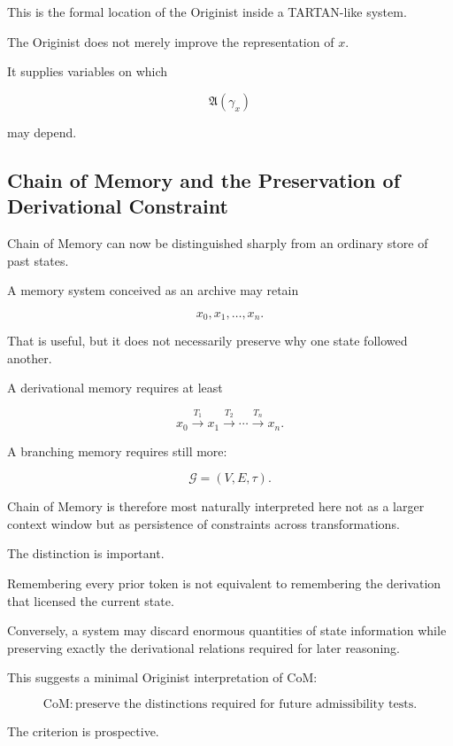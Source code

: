 \documentclass[
  11pt,
  a4paper,
  DIV=12,
  BCOR=0mm,
  parskip=half-
]{scrartcl}
\newcommand{\graphG}{\mathcal G}
\theoremstyle{definition}
\theoremstyle{plain}
\theoremstyle{remark}
\begin{document}
This is the formal location of the Originist inside a TARTAN-like system.

The Originist does not merely improve the representation of \(x\).

It supplies variables on which

\[
  \mathfrak A(\gamma_x)
\]

may depend.


\subsection{Chain of Memory and the Preservation of Derivational Constraint}
\label{sec:com}

Chain of Memory can now be distinguished sharply from an ordinary store of
past states.

A memory system conceived as an archive may retain

\[
  x_0,x_1,\ldots,x_n.
\]

That is useful, but it does not necessarily preserve why one state followed
another.

A derivational memory requires at least

\[
  x_0
  \xrightarrow{T_1}
  x_1
  \xrightarrow{T_2}
  \cdots
  \xrightarrow{T_n}
  x_n.
\]

A branching memory requires still more:

\[
  \graphG=(V,E,\tau).
\]

Chain of Memory is therefore most naturally interpreted here not as a larger
context window but as persistence of constraints across transformations.

The distinction is important.

Remembering every prior token is not equivalent to remembering the derivation
that licensed the current state.

Conversely, a system may discard enormous quantities of state information
while preserving exactly the derivational relations required for later
reasoning.

This suggests a minimal Originist interpretation of CoM:

\[
  \mathrm{CoM}
  :
  \text{preserve the distinctions required for future admissibility tests}.
\]

The criterion is prospective.
\end{document}
